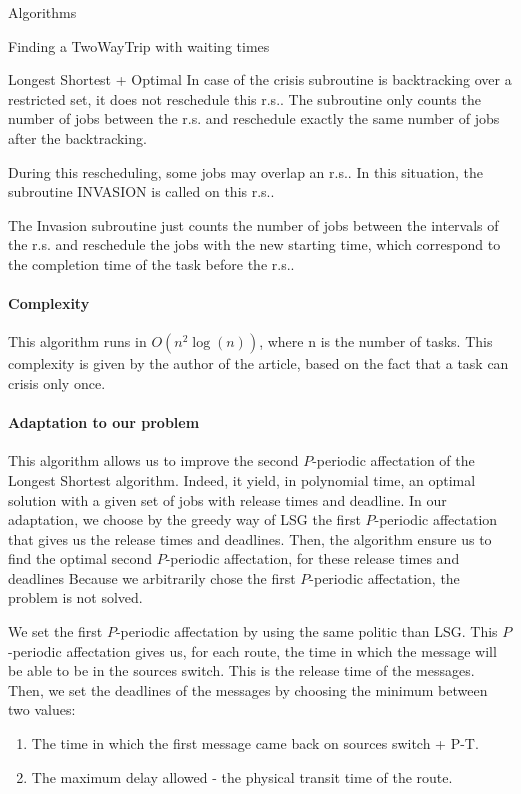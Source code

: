 \documentclass[a4paper,10pt]{report}
\begin{document}
\begin{chapter}{Algorithms}
\begin{section}{Finding a TwoWayTrip with waiting times}
\begin{subsection}{Longest Shortest + Optimal}
In case of the crisis subroutine is backtracking over a restricted set, it does not reschedule this r.s.. The subroutine only counts
the number of jobs between the r.s. and reschedule exactly the same number of jobs after the backtracking.

During this rescheduling, some jobs may overlap an r.s.. In this situation, the subroutine INVASION is called on this r.s..

The Invasion subroutine just counts the number of jobs between the intervals of the r.s. and reschedule the jobs with the new starting time,
which correspond to the completion time of the task before the r.s..



\paragraph{Complexity}
This algorithm runs in $O(n^2 \log(n))$, where n is the number of tasks. This complexity is given by the author of the article, based on the fact that a task can crisis only once.

\paragraph{Adaptation to our problem}
This algorithm allows us to improve the second $P$-periodic affectation of the Longest Shortest algorithm. 
Indeed, it yield, in polynomial time, an optimal solution with a given set of jobs with release times and deadline. 
In our adaptation, we choose by the greedy way of LSG the first $P$-periodic affectation that gives us the release times and deadlines. Then, the algorithm ensure us to find the optimal second $P$-periodic affectation, for these release times and deadlines
Because we arbitrarily chose the first $P$-periodic affectation, the problem is not solved.

We set the first $P$-periodic affectation by using the same politic than LSG. This $P$-periodic affectation gives us, for each route, the time in which the message will be able to be in the sources switch. This is the release time of the messages. Then, we set the deadlines of the messages by choosing the minimum between two values: 
\begin{enumerate}
 \item The time in which the first message came back on sources switch + P-T.
 \item The maximum delay allowed - the physical transit time of the route.
\end{enumerate}


\end{subsection}
\end{section}
\end{chapter}
\end{document}
